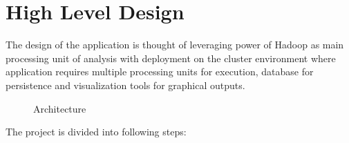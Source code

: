 \documentclass[9pt,twocolumn,twoside]{../../styles/osajnl}
\begin{document}
\section{High Level Design}

The design of the application is thought of leveraging power of Hadoop as main processing unit of
analysis with deployment on the cluster environment where application requires multiple processing
units for execution, database for persistence and visualization tools for graphical outputs.
\begin{figure}[htbp]
\centering
{}
\caption{Architecture}
\label{Reference:false-color}
\end{figure}
The project is divided into following steps:
\end{document}
